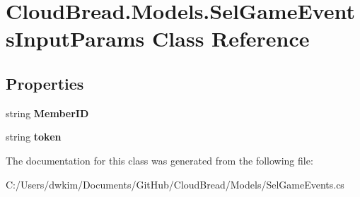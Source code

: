 \hypertarget{a00086}{}\section{Cloud\+Bread.\+Models.\+Sel\+Game\+Events\+Input\+Params Class Reference}
\label{a00086}
\subsection*{Properties}
\begin{DoxyCompactItemize}
\item 
string {\bfseries Member\+ID}\hypertarget{a00086_a7a37a9ed9304df466e19137d5f7d9ad6}{}\label{a00086_a7a37a9ed9304df466e19137d5f7d9ad6}

\item 
string {\bfseries token}\hypertarget{a00086_af80481e75cddbe00d2cbc3799d5545e3}{}\label{a00086_af80481e75cddbe00d2cbc3799d5545e3}

\end{DoxyCompactItemize}


The documentation for this class was generated from the following file\+:\begin{DoxyCompactItemize}
\item 
C\+:/\+Users/dwkim/\+Documents/\+Git\+Hub/\+Cloud\+Bread/\+Models/Sel\+Game\+Events.\+cs\end{DoxyCompactItemize}
